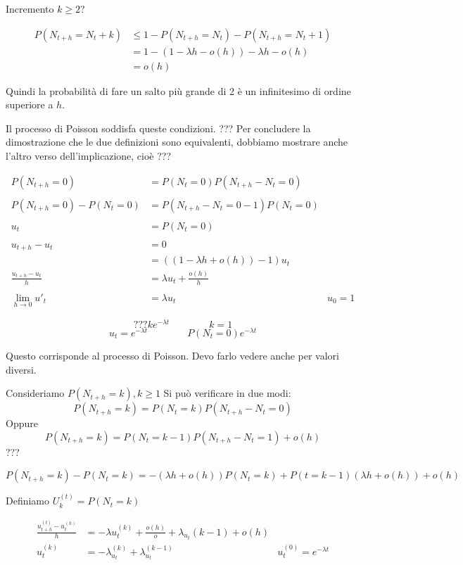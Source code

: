 \documentclass[a4paper,12pt]{book}
\begin{document}
Incremento $ k \ge 2 $?

\begin{align*}	
	P(N_{t+h} = N_t + k) & \le 1 - P(N_{t+h} = N_t) - P(N_{t+h} = N_t + 1) \\
	& = 1 - (1 - \lambda h - o(h)) - \lambda h - o(h) \\
	& = o(h)
\end{align*}

Quindi la probabilità di fare un salto più grande di 2 è un infinitesimo di ordine superiore a $ h $. 

Il processo di Poisson soddisfa queste condizioni. ??? %
Per concludere la dimostrazione che le due definizioni sono equivalenti, dobbiamo mostrare anche l'altro verso dell'implicazione, cioè ??? %

\begin{align*}
	P(N_{t+h} = 0) & = P(N_t = 0) P(N_{t+h} - N_t = 0) \\
	\\
	P(N_{t+h} = 0) - P(N_t = 0) & = P(N_{t+h} - N_t = 0 - 1 )P(N_t = 0) \\
	\\
	u_t & = P(N_t = 0) \\
	\\
	u_{t+h} - u_t & = 0 \\
	& = ((1 - \lambda h + o(h)) - 1 ) u_t \\
	\frac{u_{t+h} - u_t}{h} & = \lambda u_t + \frac{o(h)}{h} \\
	\\
	\lim\limits_{h \to 0} u'_t & = \lambda u_t & u_0 = 1
\end{align*}

$$ 	??? ke^{-\lambda t} \qquad \qquad k = 1$$
$$ u_t = e^{-\lambda t} \qquad \qquad P(N_t = 0) e^{-\lambda t} $$

Questo corrisponde al processo di Poisson. Devo farlo vedere anche per valori diversi.

Consideriamo $ P(N_{t+h} = k), k \ge 1 $
Si può verificare in due modi:
$$ P(N_{t+h} = k) = P(N_t = k) P(N_{t+h} - N_t = 0) $$
Oppure
$$ P(N_{t+h} = k) = P(N_t = k-1)P(N_{t+h} -N_t = 1) + o(h) $$
??? %

$$ P(N_{t+h} = k) - P(N_t = k) = -(\lambda h + o(h)) P(N_{t} = k) + P(t = k - 1)(\lambda h + o(h)) + o(h) $$

Definiamo $ U_k^{(t)} = P(N_{t} = k) $

\begin{align*}
	\frac{u_{t+h}^{(t)}  - u_t^{(k)} }{h} & = -\lambda u_t^{(k)} + \frac{o(h)}{o} + \lambda_{u_t}(k-1) + o(h) \\
	u_t^{(k)} & = -\lambda_{u_t}^{(k)} + \lambda_{u_t}^{(k-1)} & u_t^{(0)} = e^{-\lambda t}
\end{align*}
\end{document}
